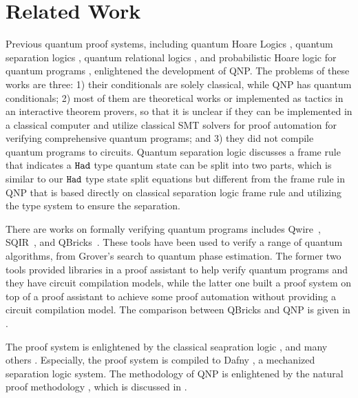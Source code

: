 \section{Related Work}
\label{sec:related}

Previous quantum proof systems, including quantum Hoare Logics \cite{qhoare,qhoreusage,10.1145/3456877,10.1007/s00165-018-0465-3},
quantum separation logics \cite{qseplocal,qsepa}, quantum relational logics \cite{relationlogic,10.1145/3290346}, and probabilistic Hoare logic for quantum programs \cite{10.1007/978-3-642-10622-4_7}, enlightened the development of QNP. The problems of these works are three: 1) their conditionals are solely classical, while QNP has quantum conditionals; 2) most of them are theoretical works or implemented as tactics in an interactive theorem provers, so that it is unclear if they can be implemented in a classical computer and utilize classical SMT solvers for proof automation for verifying comprehensive quantum programs; and 3) they did not compile quantum programs to circuits. 
Quantum separation logic \cite{qseplocal} discusses a frame rule that indicates a $\texttt{Had}$ type quantum state can be split into two parts, which is similar to our $\texttt{Had}$ type state split equations but different from the frame rule in QNP that is based directly on classical separation logic frame rule and utilizing the \qafny type system to ensure the separation. 

There are works on formally verifying quantum programs includes Qwire~\cite{RandThesis}, SQIR~\cite{PQPC}, and QBricks~\cite{qbricks}. These tools have been used to verify a range of quantum algorithms, from Grover's search to quantum phase estimation.
The former two tools provided libraries in a proof assistant to help verify quantum programs and they have circuit compilation models, while the latter one built a proof system on top of a proof assistant to achieve some proof automation without providing a circuit compilation model. The comparison between QBricks and QNP is given in .

The \qafny proof system is enlightened by the classical seapration logic \cite{separationlogic}, and many others \cite{10.1145/3453483.3454087,arxiv.1609.00919,10.1007/978-3-319-89960-2_13,10.1007/978-3-319-89960-2_2,nat-proof-fun}. Especially, the \qafny proof system is compiled to Dafny \cite{10.1007/978-3-642-17511-4_20}, a mechanized separation logic system. The methodology of QNP is enlightened by the natural proof methodology \cite{nat-proof-fun,nat-proof-frame,10.1145/2103621.2103673}, which is discussed in .



